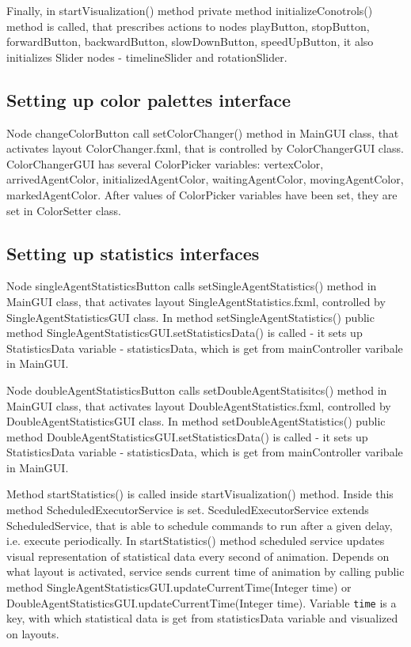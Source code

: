 \documentclass[thesis=B,english]{FITthesis}[2019/12/23]
\begin{document}
Finally, in startVisualization() method private method initializeConotrols() method is called, that prescribes actions to nodes playButton, stopButton, forwardButton, backwardButton, slowDownButton, speedUpButton, it also initializes Slider nodes - timelineSlider and rotationSlider. 

\subsection{Setting up color palettes interface}

Node changeColorButton call setColorChanger() method in MainGUI class, that activates layout ColorChanger.fxml, that is controlled by ColorChangerGUI class. ColorChangerGUI has several ColorPicker variables: vertexColor, arrivedAgentColor, initializedAgentColor, waitingAgentColor, movingAgentColor, markedAgentColor. After values of ColorPicker variables have been set, they are set in ColorSetter class.  


\subsection{Setting up statistics interfaces}

Node singleAgentStatisticsButton calls setSingleAgentStatistics() method in MainGUI class, that activates layout SingleAgentStatistics.fxml, controlled by SingleAgentStatisticsGUI class. In method setSingleAgentStatistics() public method SingleAgentStatisticsGUI.setStatisticsData() is called -  it sets up StatisticsData variable - statisticsData, which is get from mainController varibale in MainGUI. 

Node doubleAgentStatisticsButton calls setDoubleAgentStatisitcs() method in MainGUI class, that activates layout DoubleAgentStatistics.fxml, controlled by DoubleAgentStatisticsGUI class. In method setDoubleAgentStatistics() public method 
DoubleAgentStatisticsGUI.setStatisticsData() is called -  it sets up StatisticsData variable - statisticsData, which is get from mainController varibale in MainGUI.

Method startStatistics() is called inside startVisualization() method. Inside this method ScheduledExecutorService is set. SceduledExecutorService extends ScheduledService, that is able to schedule commands to run after a given delay, i.e. execute periodically. In startStatistics() method scheduled service updates visual representation of statistical data every second of animation. Depends on what layout is activated, service sends current time of animation by calling public method SingleAgentStatisticsGUI.updateCurrentTime(Integer time) or DoubleAgentStatisticsGUI.updateCurrentTime(Integer time). Variable \verb|time| is a key, with which statistical data is get from statisticsData variable and visualized on layouts.
\end{document}
